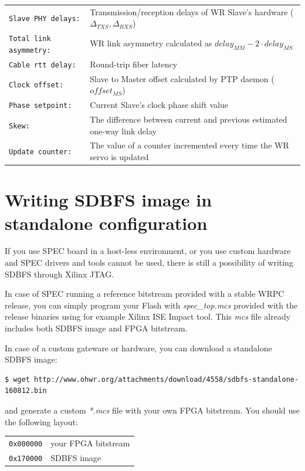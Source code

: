 \documentclass[a4paper, 12pt]{article}
\newcommand{\code}[1]{\texttt{#1}}
\begin{document}
\begin{longtable}{  p{4.5cm}  p{10cm} }
  \code{Slave PHY delays:} & Transmission/reception delays of WR Slave's
    hardware ($\Delta_{TXS}, \Delta_{RXS}$)\\

  \code{Total link asymmetry:} & WR link asymmetry calculated as
    $delay_{MM} - 2 \cdot delay_{MS}$\\

  \code{Cable rtt delay:} & Round-trip fiber latency\\

  \code{Clock offset:} & Slave to Master offset calculated by PTP daemon
  ($ offset_{MS} $)\\

  \code{Phase setpoint:} & Current Slave's clock phase shift value\\

  \code{Skew:} & The difference between current and previous estimated
    one-way link delay\\

  \code{Update counter:} & The value of a counter incremented every time
    the WR servo is updated\\

\end{longtable}
\renewcommand\arraystretch{1}


\clearpage
\section{Writing SDBFS image in standalone configuration}
\label{Writing SDBFS image in standalone configuration}

If you use SPEC board in a host-less environment, or you use custom
hardware and SPEC drivers and tools cannot be used, there is still a
possibility of writing SDBFS through Xilinx JTAG.

\vspace{1em}
In case of SPEC running a reference bitstream provided with a stable
WRPC release, you can simply program your Flash with \textit{spec\_top.mcs}
provided with the release binaries using for example Xilinx ISE Impact tool.
This \textit{mcs} file already includes both SDBFS image and FPGA bitstream.

In case of a custom gateware or hardware, you can download a standalone
SDBFS image:
\begin{lstlisting}
$ wget http://www.ohwr.org/attachments/download/4558/sdbfs-standalone-160812.bin
\end{lstlisting}
and generate a custom \textit{*.mcs} file with your own FPGA bitstream. You should
use the following layout:
\begin{longtable}{  l  l }
\code{0x000000} & your FPGA bitstream \\
\code{0x170000} & SDBFS image\\
\end{longtable}
\end{document}
